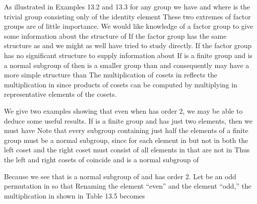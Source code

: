 \documentclass[11pt,oneside]{article}
\begin{document}
\begin{BookBody}
As illustrated in Examples 13.2 and 13.3 for any group  we have  and  where  is the trivial group consisting only of the identity element  These two extremes of factor groups are of little importance. We would like knowledge of a factor group  to give some information about the structure of  If  the factor group has the same structure as  and we might as well have tried to study  directly. If  the factor group has no significant structure to supply information about  If  is a finite group and  is a normal subgroup of  then  is a smaller group than  and consequently may have a more simple structure than  The multiplication of cosets in  reflects the multiplication in  since products of cosets can be computed by multiplying in  representative elements of the cosets.

We give two examples showing that even when  has order 2, we may be able to deduce some useful results. If  is a finite group and  has just two elements, then we must have  Note that every subgroup  containing just half the elements of a finite group  must be a normal subgroup, since for each element  in  but not in  both the left coset  and the right coset  must consist of all elements in  that are not in  Thus the left and right cosets of  coincide and  is a normal subgroup of 

 Because  we see that  is a normal subgroup of  and  has order 2. Let \BookInline{\sigma } be an odd permutation in  so that  Renaming the element  “even” and the element  “odd,” the multiplication in  shown in Table 13.5 becomes


\end{BookBody}
\end{document}
